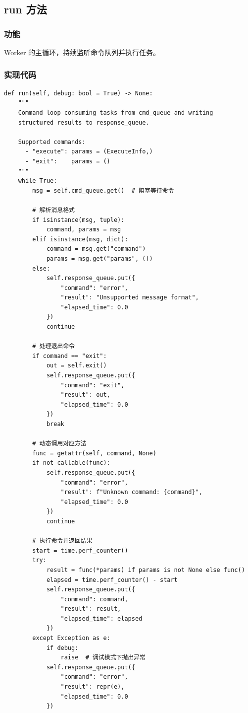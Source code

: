 \documentclass[12pt,a4paper]{article}
\begin{document}
\subsection{run 方法}

\subsubsection{功能}

Worker 的主循环，持续监听命令队列并执行任务。

\subsubsection{实现代码}

\begin{lstlisting}
def run(self, debug: bool = True) -> None:
    """
    Command loop consuming tasks from cmd_queue and writing
    structured results to response_queue.
    
    Supported commands:
      - "execute": params = (ExecuteInfo,)
      - "exit":    params = ()
    """
    while True:
        msg = self.cmd_queue.get()  # 阻塞等待命令
        
        # 解析消息格式
        if isinstance(msg, tuple):
            command, params = msg
        elif isinstance(msg, dict):
            command = msg.get("command")
            params = msg.get("params", ())
        else:
            self.response_queue.put({
                "command": "error",
                "result": "Unsupported message format",
                "elapsed_time": 0.0
            })
            continue
        
        # 处理退出命令
        if command == "exit":
            out = self.exit()
            self.response_queue.put({
                "command": "exit",
                "result": out,
                "elapsed_time": 0.0
            })
            break
        
        # 动态调用对应方法
        func = getattr(self, command, None)
        if not callable(func):
            self.response_queue.put({
                "command": "error",
                "result": f"Unknown command: {command}",
                "elapsed_time": 0.0
            })
            continue
        
        # 执行命令并返回结果
        start = time.perf_counter()
        try:
            result = func(*params) if params is not None else func()
            elapsed = time.perf_counter() - start
            self.response_queue.put({
                "command": command,
                "result": result,
                "elapsed_time": elapsed
            })
        except Exception as e:
            if debug:
                raise  # 调试模式下抛出异常
            self.response_queue.put({
                "command": "error",
                "result": repr(e),
                "elapsed_time": 0.0
            })
\end{lstlisting}
\end{document}

